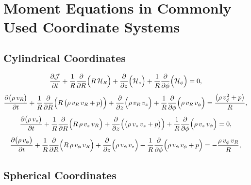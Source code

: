 \documentclass[10pt,preprint]{aastex}
\begin{document}



\appendix

\section{Moment Equations in Commonly Used Coordinate Systems}
\label{app:CurvilinearEuler}

\subsection{Cylindrical Coordinates}

\begin{equation}
  \frac{\partial \mathcal{J}}{\partial t}
  +\frac{1}{R}\frac{\partial }{\partial R}\Big(R\,\mathcal{H}_{R}\Big)
  +\frac{\partial }{\partial z}\Big(\mathcal{H}_{z}\Big)
  +\frac{1}{R}\frac{\partial }{\partial \phi}\Big(\mathcal{H}_{\phi}\Big)=0,
\end{equation}
\begin{equation}
  \frac{\partial \big(\rho\,v_{R}\big)}{\partial t}
  +\frac{1}{R}\frac{\partial }{\partial R}\Big(R\,\big(\rho\,v_{R}\,v_{R}+p\big)\Big)
  +\frac{\partial }{\partial z}\Big(\rho\,v_{R}\,v_{z}\Big)
  +\frac{1}{R}\frac{\partial }{\partial \phi}\Big(\rho\,v_{R}\,v_{\phi}\Big)
  =\frac{\big(\rho\,v_{\phi}^{2}+p\big)}{R},
\end{equation}
\begin{equation}
  \frac{\partial \big(\rho\,v_{z}\big)}{\partial t}
  +\frac{1}{R}\frac{\partial }{\partial R}\Big(R\,\rho\,v_{z}\,v_{R}\Big)
  +\frac{\partial }{\partial z}\Big(\big(\rho\,v_{z}\,v_{z}+p\big)\Big)
  +\frac{1}{R}\frac{\partial }{\partial \phi}\Big(\rho\,v_{z}\,v_{\phi}\Big)=0,
\end{equation}
\begin{equation}
  \frac{\partial \big(\rho\,v_{\phi}\big)}{\partial t}
  +\frac{1}{R}\frac{\partial }{\partial R}\Big(R\,\rho\,v_{\phi}\,v_{R}\Big)
  +\frac{\partial }{\partial z}\Big(\rho\,v_{\phi}\,v_{z}\Big)
  +\frac{1}{R}\frac{\partial }{\partial \phi}\Big(\rho\,v_{\phi}\,v_{\phi}+p\Big)
  =-\frac{\rho\,v_{\phi}\,v_{R}}{R},
\end{equation}

\subsection{Spherical Coordinates}
\end{document}
